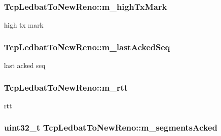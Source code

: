 \subsubsection[{\texorpdfstring{m\+\_\+high\+Tx\+Mark}{m_highTxMark}}]{ Tcp\+Ledbat\+To\+New\+Reno\+::m\+\_\+high\+Tx\+Mark\hspace{0.3cm}{\ttfamily [private]}}\hypertarget{classTcpLedbatToNewReno_a8938df0afdcd786ce94b80575a1e3c2f}{}\label{classTcpLedbatToNewReno_a8938df0afdcd786ce94b80575a1e3c2f}


high tx mark 

\subsubsection[{\texorpdfstring{m\+\_\+last\+Acked\+Seq}{m_lastAckedSeq}}]{ Tcp\+Ledbat\+To\+New\+Reno\+::m\+\_\+last\+Acked\+Seq\hspace{0.3cm}{\ttfamily [private]}}\hypertarget{classTcpLedbatToNewReno_ab87dd8f34fa91a9b6e19a18b7195e7e4}{}\label{classTcpLedbatToNewReno_ab87dd8f34fa91a9b6e19a18b7195e7e4}


last acked seq 

\subsubsection[{\texorpdfstring{m\+\_\+rtt}{m_rtt}}]{ Tcp\+Ledbat\+To\+New\+Reno\+::m\+\_\+rtt\hspace{0.3cm}{\ttfamily [private]}}\hypertarget{classTcpLedbatToNewReno_afb17eba81eb0aa1b5d04f5378f2e5906}{}\label{classTcpLedbatToNewReno_afb17eba81eb0aa1b5d04f5378f2e5906}


rtt 

\subsubsection[{\texorpdfstring{m\+\_\+segments\+Acked}{m_segmentsAcked}}]{\setlength{\rightskip}{0pt plus 5cm}uint32\+\_\+t Tcp\+Ledbat\+To\+New\+Reno\+::m\+\_\+segments\+Acked\hspace{0.3cm}{\ttfamily [private]}}\hypertarget{classTcpLedbatToNewReno_a620920fd8c45cf139ec4ee3311ae71e2}{}\label{classTcpLedbatToNewReno_a620920fd8c45cf139ec4ee3311ae71e2}


